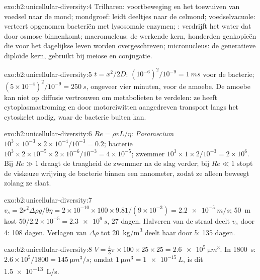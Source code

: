 \begin{solution}{exo:b2:unicellular-diversity:4}
Trilharen: voortbeweging en het toewuiven van voedsel naar de mond;
mondgroef: leidt deeltjes naar de celmond; voedselvacuole: verteert
opgenomen bacteriën met lysosomale enzymen; : verdrijft
het water dat door osmose binnenkomt; macronucleus: de werkende kern,
honderden genkopieën die voor het dagelijkse leven worden overgeschreven;
micronucleus: de generatieve diploïde kern, gebruikt bij meiose en conjugatie.
\end{solution}

\begin{solution}{exo:b2:unicellular-diversity:5}
$t = x^2/2D$: $(10^{-6})^2/10^{-9} = \qty{1}{ms}$ voor de bacterie;
$(5\times 10^{-4})^2/10^{-9} = \qty{250}{s}$, ongeveer vier minuten,
voor de amoebe. De amoebe kan niet op diffusie vertrouwen om metabolieten
te verdelen: ze heeft cytoplasmastroming en door motoreiwitten aangedreven
transport langs het cytoskelet nodig, waar de bacterie buiten kan.
\end{solution}

\begin{solution}{exo:b2:unicellular-diversity:6}
$Re = \rho vL/\eta$: \emph{Paramecium} $10^3\times 10^{-3}\times
2\times 10^{-4}/10^{-3} = 0.2$; bacterie $10^3\times 2\times
10^{-5}\times 2\times 10^{-6}/10^{-3} = 4\times 10^{-5}$; zwemmer
$10^3\times 1\times 2/10^{-3} = 2\times 10^6$. Bij $Re \gg 1$ draagt
de traagheid de zwemmer na de slag verder; bij $Re \ll 1$ stopt de
viskeuze wrijving de bacterie binnen een nanometer, zodat ze alleen
beweegt zolang ze slaat.
\end{solution}

\begin{solution}{exo:b2:unicellular-diversity:7}
$v_s = 2r^2\Delta\rho g/9\eta = 2\times 10^{-10}\times 100\times
9.81/(9\times 10^{-3}) = \qty{2.2e-5}{m/s}$; \qty{50}{m} kost
$50/2.2\times 10^{-5} = \qty{2.3e6}{s}$, 27 dagen. Halveren van de straal
deelt $v_s$ door 4: 108 dagen. Verlagen van $\Delta\rho$ tot
\qty{20}{kg/m^3} deelt haar door 5: 135 dagen.
\end{solution}

\begin{solution}{exo:b2:unicellular-diversity:8}
$V = \tfrac{4}{3}\pi\times 100\times 25\times 25 =
\qty{2.6e5}{\micro m^3}$. In \qty{1800}{s}: $2.6\times 10^5/1800 =
\qty{145}{\micro m^3/s}$; omdat $\qty{1}{\micro m^3} =
\qty{1e-15}{L}$, is dit \qty{1.5e-13}{L/s}.
\end{solution}

